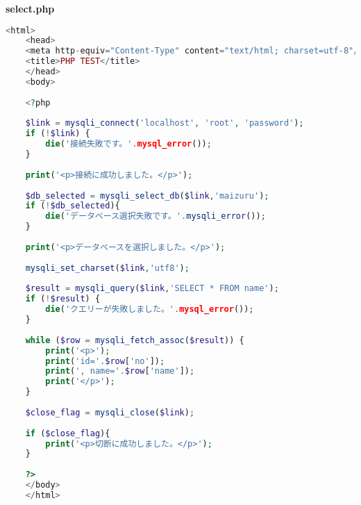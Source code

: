 \textbf{select.php}
\begin{lstlisting}[language=php]
    <html>
    <head>
    <meta http-equiv="Content-Type" content="text/html; charset=utf-8"/>
    <title>PHP TEST</title>
    </head>
    <body>
    
    <?php
    
    $link = mysqli_connect('localhost', 'root', 'password');
    if (!$link) {
        die('接続失敗です。'.mysql_error());
    }
    
    print('<p>接続に成功しました。</p>');
    
    $db_selected = mysqli_select_db($link,'maizuru');
    if (!$db_selected){
        die('データベース選択失敗です。'.mysqli_error());
    }
    
    print('<p>データベースを選択しました。</p>');
    
    mysqli_set_charset($link,'utf8');
    
    $result = mysqli_query($link,'SELECT * FROM name');
    if (!$result) {
        die('クエリーが失敗しました。'.mysql_error());
    }
    
    while ($row = mysqli_fetch_assoc($result)) {
        print('<p>');
        print('id='.$row['no']);
        print(', name='.$row['name']);
        print('</p>');
    }
    
    $close_flag = mysqli_close($link);
    
    if ($close_flag){
        print('<p>切断に成功しました。</p>');
    }
    
    ?>
    </body>
    </html>
\end{lstlisting}

